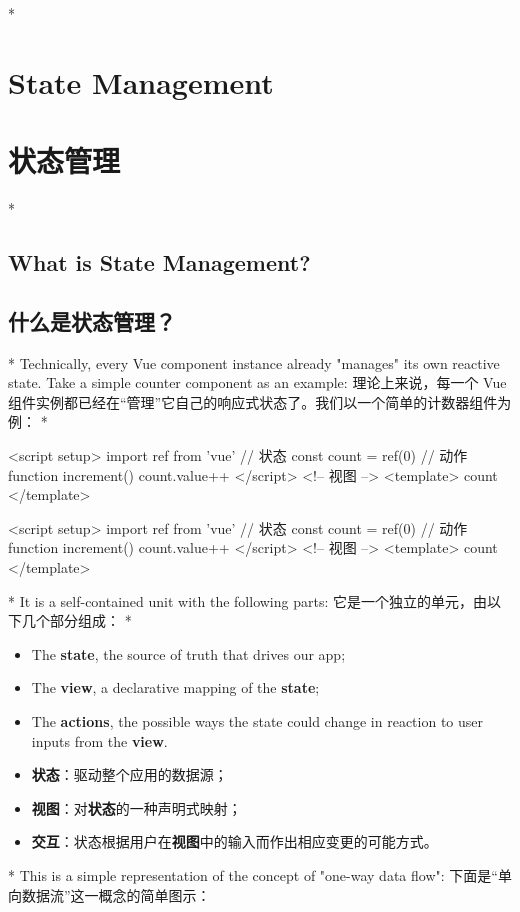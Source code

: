 \begin{paracol}{2}
 
\switchcolumn[0]*%
\section{State Management}
\switchcolumn
\section{状态管理}
\switchcolumn[0]*%
\subsection{What is State Management?}
\switchcolumn
\subsection{什么是状态管理？}
\switchcolumn[0]*%
Technically, every Vue component instance already "manages" its own
reactive state. Take a simple counter component as an example:
\switchcolumn
理论上来说，每一个 Vue
组件实例都已经在``管理''它自己的响应式状态了。我们以一个简单的计数器组件为例：
\switchcolumn[0]*%
\begin{codeHtml}
<script setup>
import { ref } from 'vue'
// 状态
const count = ref(0)
// 动作
function increment() {
  count.value++
}
</script>
<!-- 视图 -->
<template>{{ count }}</template>
\end{codeHtml}
\switchcolumn
\begin{codeHtml}
<script setup>
import { ref } from 'vue'
// 状态
const count = ref(0)
// 动作
function increment() {
  count.value++
}
</script>
<!-- 视图 -->
<template>{{ count }}</template>
\end{codeHtml}
\switchcolumn[0]*%
It is a self-contained unit with the following parts:
\switchcolumn
它是一个独立的单元，由以下几个部分组成：
\switchcolumn[0]*%
\begin{itemize}
\item
  The \textbf{state}, the source of truth that drives our app;
\item
  The \textbf{view}, a declarative mapping of the \textbf{state};
\item
  The \textbf{actions}, the possible ways the state could change in
  reaction to user inputs from the \textbf{view}.
\end{itemize}
\switchcolumn
\begin{itemize}
\item
  \textbf{状态}：驱动整个应用的数据源；
\item
  \textbf{视图}：对\textbf{状态}的一种声明式映射；
\item
  \textbf{交互}：状态根据用户在\textbf{视图}中的输入而作出相应变更的可能方式。
\end{itemize}
\switchcolumn[0]*%
This is a simple representation of the concept of "one-way data flow":
\switchcolumn
下面是``单向数据流''这一概念的简单图示：
\end{paracol}

